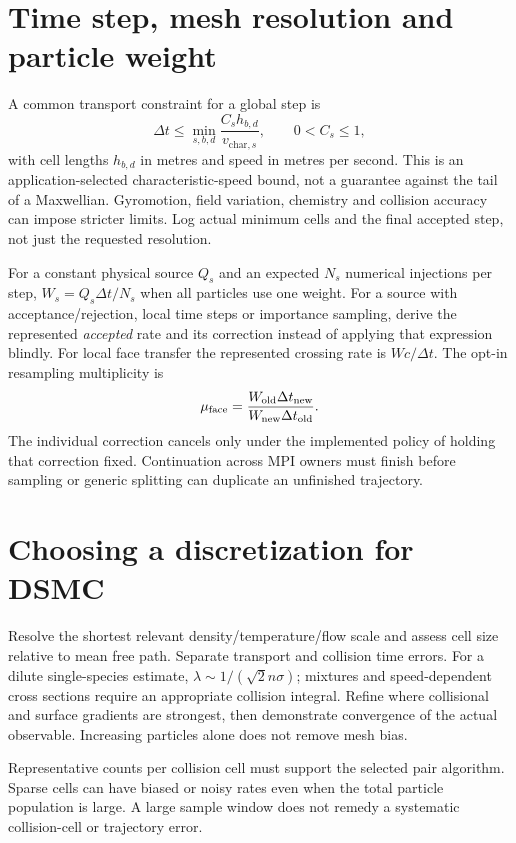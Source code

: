 \section{Time step, mesh resolution and particle weight}
A common transport constraint for a global step is
\begin{equation}
\Delta t\leq \min_{s,b,d}
\frac{C_s h_{b,d}}{v_{\mathrm{char},s}},
\qquad 0<C_s\leq 1 ,
\end{equation}
with cell lengths $h_{b,d}$ in metres and speed in metres per second.
This is an application-selected characteristic-speed bound, not a guarantee
against the tail of a Maxwellian. Gyromotion, field variation, chemistry and
collision accuracy can impose stricter limits. Log actual minimum cells and
the final accepted step, not just the requested resolution.

For a constant physical source $Q_s$ and an expected $N_s$ numerical
injections per step, $W_s=Q_s\Delta t/N_s$ when all particles use one weight.
For a source with acceptance/rejection, local time steps or importance
sampling, derive the represented \emph{accepted} rate and its correction
instead of applying that expression blindly.
For local face transfer the represented crossing rate is $Wc/\Delta t$.
The opt-in resampling multiplicity is
\begin{equation}
\mu_{\rm face}=\frac{W_{\rm old}\Delta t_{\rm new}}
{W_{\rm new}\Delta t_{\rm old}} .
\end{equation}
The individual correction cancels only under the implemented policy of
holding that correction fixed. Continuation across MPI owners must finish
before sampling or generic splitting can duplicate an unfinished trajectory.

\section{Choosing a discretization for DSMC}
Resolve the shortest relevant density/temperature/flow scale and assess cell
size relative to mean free path. Separate transport and collision time errors.
For a dilute single-species estimate,
$\lambda\sim1/(\sqrt{2}n\sigma)$; mixtures and speed-dependent cross sections
require an appropriate collision integral. Refine where collisional and
surface gradients are strongest, then demonstrate convergence of the
actual observable. Increasing particles alone does not remove mesh bias.

Representative counts per collision cell must support the selected pair
algorithm. Sparse cells can have biased or noisy rates even when the total
particle population is large. A large sample window does not remedy a
systematic collision-cell or trajectory error.

